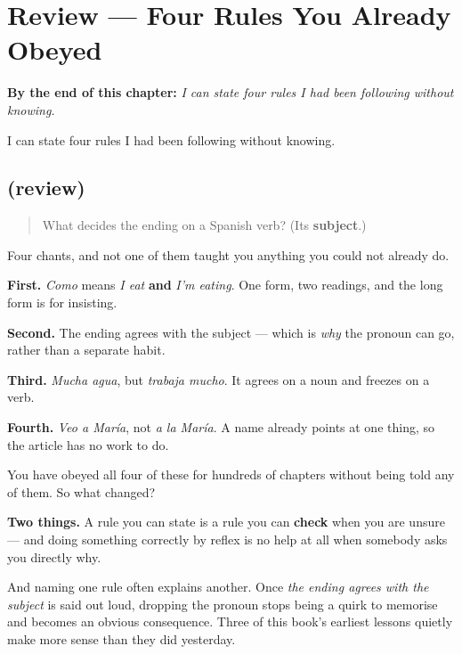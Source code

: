 
\chapter{Review --- Four Rules You Already Obeyed}
\label{ch:repaso-implicito}

\begin{chapteropening}
\textbf{By the end of this chapter:} \emph{I can state four rules I had been following without knowing.}

I can state four rules I had been following without knowing.
\end{chapteropening}

\section[(review)]{(review)}

\label{lesson:ES-C66-repaso-lo-implicito}



\begin{quote}
What decides the ending on a Spanish verb? (Its \textbf{subject}.)
\end{quote}

\begin{grammarlens}[title={What you've built}]
Four chants, and not one of them taught you anything you could not already do.

\textbf{First.} \emph{Como} means \emph{I eat} \textbf{and} \emph{I'm eating}. One form, two readings, and the long form is for insisting.

\textbf{Second.} The ending agrees with the subject — which is \emph{why} the pronoun can go, rather than a separate habit.

\textbf{Third.} \emph{Mucha agua}, but \emph{trabaja mucho}. It agrees on a noun and freezes on a verb.

\textbf{Fourth.} \emph{Veo a María}, not \emph{a la María}. A name already points at one thing, so the article has no work to do.
\end{grammarlens}

\begin{grammarlens}[title={Grammar Lens: why naming it was worth a chapter}]
You have obeyed all four of these for hundreds of chapters without being told any of them. So what changed?

\textbf{Two things.} A rule you can state is a rule you can \textbf{check} when you are unsure — and doing something correctly by reflex is no help at all when somebody asks you directly why.

And naming one rule often explains another. Once \emph{the ending agrees with the subject} is said out loud, dropping the pronoun stops being a quirk to memorise and becomes an obvious consequence. Three of this book's earliest lessons quietly make more sense than they did yesterday.
\end{grammarlens}

